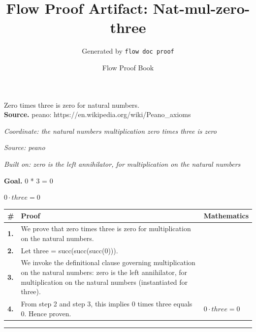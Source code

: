 \documentclass[11pt]{article}
\title{Flow Proof Artifact: Nat-mul-zero-three}
\author{Generated by \texttt{flow doc proof}}
\date{Flow Proof Book}
\theoremstyle{definition}
\begin{document}
\maketitle
Zero times three is zero for natural numbers.\\[0.5em]
\textbf{Source.} peano: https://en.wikipedia.org/wiki/Peano\_axioms\\[0.5em]
\bigskip
{}\par
\smallskip\noindent\textit{Coordinate: the natural numbers \cdot multiplication \cdot zero times three is zero}\par
\smallskip\noindent\textit{Source: peano}\par
\smallskip\noindent\textit{Built on: zero is the left annihilator, for multiplication on the natural numbers}\par
\medskip
\noindent\textbf{Goal.} 0 * 3 = 0\par
\noindent$\displaystyle 0 \cdot three = 0$\par
\medskip
\noindent
\begin{tabular}{@{} >{\raggedright\arraybackslash}p{} >{\raggedright\arraybackslash}p{} >{\raggedleft\arraybackslash}p{} @{}}
\textbf{\#} & \textbf{Proof} & \textbf{Mathematics} \\
\midrule
\textbf{1.} & We prove that zero times three is zero for multiplication on the natural numbers. & \\[0.45em]
\textbf{2.} & Let three = succ(succ(succ(0))). & \\[0.45em]
\textbf{3.} & We invoke the definitional clause governing multiplication on the natural numbers: zero is the left annihilator, for multiplication on the natural numbers (instantiated for three). & \\[0.45em]
\textbf{4.} & From step 2 and step 3, this implies 0 times three equals 0. Hence proven. & $\displaystyle 0 \cdot three = 0$ \\[0.45em]
\bottomrule
\end{tabular}
\label{thm:Nat-multiplication-zero_times_three_is_zero}
\par\medskip\hrule
\end{document}
